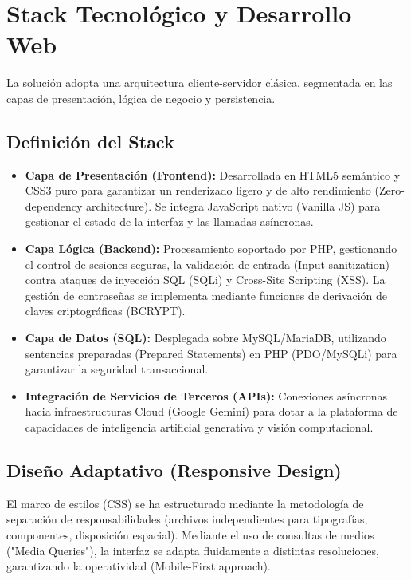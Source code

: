 \documentclass[12pt,a4paper]{article}
\begin{document}
\newpage
\section{Stack Tecnológico y Desarrollo Web}
\label{PaginaWeb}

La solución adopta una arquitectura cliente-servidor clásica, segmentada en las capas de presentación, lógica de negocio y persistencia.

\subsection{Definición del Stack}
\begin{itemize}
    \item \textbf{Capa de Presentación (Frontend):} Desarrollada en HTML5 semántico y CSS3 puro para garantizar un renderizado ligero y de alto rendimiento (Zero-dependency architecture). Se integra JavaScript nativo (Vanilla JS) para gestionar el estado de la interfaz y las llamadas asíncronas.
    \item \textbf{Capa Lógica (Backend):} Procesamiento soportado por PHP, gestionando el control de sesiones seguras, la validación de entrada (Input sanitization) contra ataques de inyección SQL (SQLi) y Cross-Site Scripting (XSS). La gestión de contraseñas se implementa mediante funciones de derivación de claves criptográficas (BCRYPT).
    \item \textbf{Capa de Datos (SQL):} Desplegada sobre MySQL/MariaDB, utilizando sentencias preparadas (Prepared Statements) en PHP (PDO/MySQLi) para garantizar la seguridad transaccional.
    \item \textbf{Integración de Servicios de Terceros (APIs):} Conexiones asíncronas hacia infraestructuras Cloud (Google Gemini) para dotar a la plataforma de capacidades de inteligencia artificial generativa y visión computacional.
\end{itemize}

\subsection{Diseño Adaptativo (Responsive Design)}
El marco de estilos (CSS) se ha estructurado mediante la metodología de separación de responsabilidades (archivos independientes para tipografías, componentes, disposición espacial). Mediante el uso de consultas de medios ("Media Queries"), la interfaz se adapta fluidamente a distintas resoluciones, garantizando la operatividad (Mobile-First approach).
\end{document}
